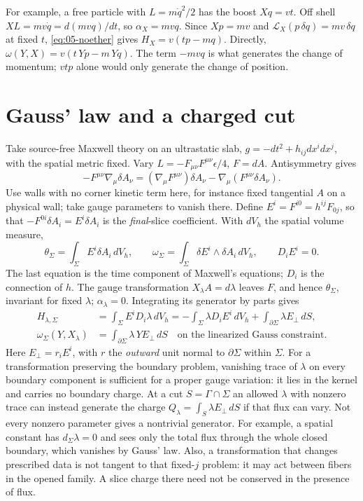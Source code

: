 For example, a free particle with $L=m\dot q^2/2$ has the boost $Xq=vt$.
Off shell $XL=mv\dot q=d(mvq)/dt$, so $\alpha_X=mvq$. Since
$Xp=mv$ and $\mathcal L_X(p\,\delta q)=mv\,\delta q$ at fixed $t$,
\eqref{eq:05-noether} gives $H_X=v(tp-mq)$. Directly,
$\omega(Y,X)=v(t\,Yp-m\,Yq)$. The term $-mvq$ is what generates the change
of momentum; $vtp$ alone would only generate the change of position.

\section{Gauss' law and a charged cut}
Take source-free Maxwell theory on an ultrastatic slab,
$g=-dt^2+h_{ij}dx^i dx^j$, with the spatial metric fixed. Vary
$L=-F_{\mu\nu}F^{\mu\nu}\epsilon/4$, $F=dA$. Antisymmetry gives
\[
 -F^{\mu\nu}\nabla_\mu\delta A_\nu
 =(\nabla_\mu F^{\mu\nu})\delta A_\nu
     -\nabla_\mu(F^{\mu\nu}\delta A_\nu).
\]
Use walls with no corner kinetic term here, for instance fixed tangential
$A$ on a physical wall; take gauge parameters to vanish there. Define
$E^i=F^{i0}=h^{ij}F_{0j}$, so that $-F^{0i}\delta A_i=E^i\delta A_i$ is
the \emph{final}-slice coefficient. With $dV_h$ the spatial volume measure,
\[
 \theta_\Sigma=\int_\Sigma E^i\delta A_i\,dV_h,
 \qquad \omega_\Sigma=\int_\Sigma\delta E^i\wedge\delta A_i\,dV_h,
 \qquad D_iE^i=0.
\]
The last equation is the time component of Maxwell's equations; $D_i$ is
the connection of $h$. The gauge transformation $X_\lambda A=d\lambda$
leaves $F$, and hence $\theta_\Sigma$, invariant for fixed $\lambda$;
$\alpha_\lambda=0$. Integrating its generator by parts gives
\begin{align*}
 H_{\lambda,\Sigma}
 &=\int_\Sigma E^i D_i\lambda\,dV_h
 =-\int_\Sigma\lambda D_iE^i\,dV_h
    +\int_{\partial\Sigma}\lambda E_\perp\,dS,\\
 \omega_\Sigma(Y,X_\lambda)
 &=\int_{\partial\Sigma}\lambda\,Y E_\perp\,dS
 \quad\text{on the linearized Gauss constraint}.
\end{align*}
Here $E_\perp=r_iE^i$, with $r$ the \emph{outward} unit normal to
$\partial\Sigma$ within $\Sigma$. For a transformation preserving the boundary
problem, vanishing trace of $\lambda$ on every boundary component is
sufficient for a proper gauge variation: it lies in the
kernel and carries no boundary charge. At a cut $S=\Gamma\cap\Sigma$ an
allowed $\lambda$ with nonzero trace can instead generate the charge
$Q_\lambda=\int_S\lambda E_\perp\,dS$ if that flux can vary. Not every
nonzero parameter gives a nontrivial generator. For example, a spatial
constant has $d_\Sigma\lambda=0$ and sees only the total flux through the
whole closed boundary, which vanishes by Gauss' law. Also, a transformation
that changes prescribed data is not tangent to that fixed-$j$ problem: it
may act between fibers in the opened family. A slice charge there need not
be conserved in the presence of flux.

